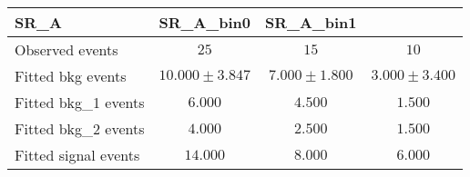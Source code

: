 \documentclass{standalone}
\begin{document}
\begin{tabular}{lccc}
\toprule
SR\_A & SR\_A\_bin0 & SR\_A\_bin1 \\
\midrule
Observed events & $25$ & $15$ & $10$\\

\midrule
Fitted bkg events & $  10.000 \pm    3.847$ & $   7.000 \pm    1.800$ & $   3.000 \pm    3.400$\\

\midrule
Fitted bkg\_1 events & $   6.000$ & $   4.500$ & $   1.500$\\
Fitted bkg\_2 events & $   4.000$ & $   2.500$ & $   1.500$\\
Fitted signal events & $  14.000$ & $   8.000$ & $   6.000$\\

\bottomrule
\end{tabular}
\end{document}
